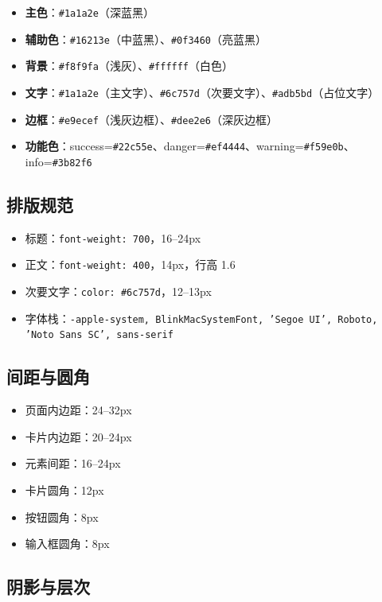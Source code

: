 \documentclass[11pt,a4paper]{article}
\begin{document}
\begin{itemize}[nosep]
  \item \textbf{主色}：\texttt{\#1a1a2e}（深蓝黑）
  \item \textbf{辅助色}：\texttt{\#16213e}（中蓝黑）、\texttt{\#0f3460}（亮蓝黑）
  \item \textbf{背景}：\texttt{\#f8f9fa}（浅灰）、\texttt{\#ffffff}（白色）
  \item \textbf{文字}：\texttt{\#1a1a2e}（主文字）、\texttt{\#6c757d}（次要文字）、\texttt{\#adb5bd}（占位文字）
  \item \textbf{边框}：\texttt{\#e9ecef}（浅灰边框）、\texttt{\#dee2e6}（深灰边框）
  \item \textbf{功能色}：success=\texttt{\#22c55e}、danger=\texttt{\#ef4444}、warning=\texttt{\#f59e0b}、info=\texttt{\#3b82f6}
\end{itemize}

\subsection{排版规范}

\begin{itemize}[nosep]
  \item 标题：\texttt{font-weight: 700}，16--24px
  \item 正文：\texttt{font-weight: 400}，14px，行高 1.6
  \item 次要文字：\texttt{color: \#6c757d}，12--13px
  \item 字体栈：\texttt{-apple-system, BlinkMacSystemFont, 'Segoe UI', Roboto, 'Noto Sans SC', sans-serif}
\end{itemize}

\subsection{间距与圆角}

\begin{itemize}[nosep]
  \item 页面内边距：24--32px
  \item 卡片内边距：20--24px
  \item 元素间距：16--24px
  \item 卡片圆角：12px
  \item 按钮圆角：8px
  \item 输入框圆角：8px
\end{itemize}

\subsection{阴影与层次}
\end{document}
